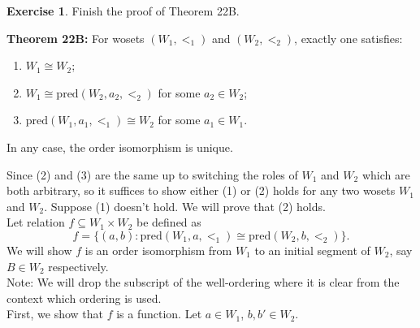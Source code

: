\documentclass{article}
\theoremstyle{definition}
\newtheorem{exercise}{Exercise}[section]
\newcommand{\so}{\text{\textbf{Solution: }}}
\begin{document}
    \begin{exercise}
        Finish the proof of Theorem 22B.
        
        \noindent \textbf{Theorem 22B:} For wosets \((W_1, <_1)\) and \((W_2, <_2)\), exactly one satisfies:
        \begin{enumerate}
            \item \(W_1 \cong W_2\);
            \item \(W_1 \cong \text{pred}(W_2, a_2, <_2)\) for some \(a_2 \in W_2\);
            \item \(\text{pred}(W_1, a_1, <_1) \cong W_2\) for some \(a_1 \in W_1\).
        \end{enumerate}
        In any case, the order isomorphism is unique.

        \noindent \so Since (2) and (3) are the same up to switching the roles of $W_1$ and $W_2$ which are both arbitrary, so it suffices to show either (1) or (2) holds for any two wosets $W_1$ and $W_2$. Suppose (1) doesn't hold. We will prove that (2) holds. \vspace{1em}\\
        \noindent Let relation \( f \subseteq W_1 \times W_2 \) be defined as
        $$f = \{(a, b) : \text{pred}(W_1, a, <_1) \cong \text{pred}(W_2, b, <_2)\}.$$
        We will show $f$ is an order isomorphism from $W_1$ to an initial segment of $W_2$, say $B \in W_2$ respectively. \\
        Note: We will drop the subscript of the well-ordering where it is clear from the context which ordering is used. \\
        First, we show that $f$ is a function. Let $a \in W_1$, $b, b' \in W_2$.
        

\end{exercise}
\end{document}
